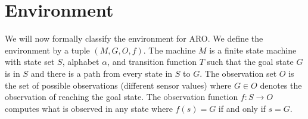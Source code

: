 \documentclass[letterpaper]{article} %
\begin{document}






\section{Environment}

We will now formally classify the environment for ARO. We define the environment by a tuple $(M, G, O, f)$. The machine $M$ is a finite state machine with state set $S$, alphabet $\alpha$, and transition function $T$ such that the goal state $G$ is in $S$ and there is a path from every state in $S$ to $G$. The observation set $O$ is the set of possible observations (different sensor values) where $G \in O$ denotes the observation of reaching the goal state. The observation function $f: S \rightarrow O$ computes what is observed in any state where $f(s) = G$ if and only if $s = G$. 
\end{document}
